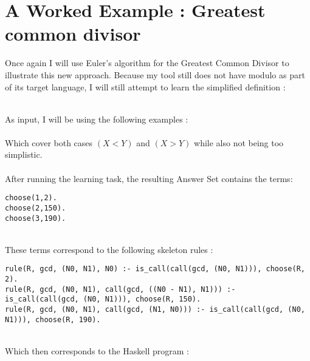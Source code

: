 \section{A Worked Example : Greatest common divisor}
Once again I will use Euler's algorithm for the Greatest Common Divisor to illustrate this new approach. Because my tool still does not have modulo as part of its target language, I will still attempt to learn the simplified definition :

 
\mbox{} \\
As input, I will be using the following examples : \\

 
\mbox{} \\
Which cover both cases $(X < Y)$ and $(X > Y)$ while also not being too simplistic. \\ \\
After running the learning task, the resulting Answer Set contains the terms: \\

\begin{lstlisting}
choose(1,2).
choose(2,150).
choose(3,190).
\end{lstlisting}
\mbox{} \\
These terms correspond to the following skeleton rules : \\

\begin{lstlisting}
rule(R, gcd, (N0, N1), N0) :- is_call(call(gcd, (N0, N1))), choose(R, 2). 
rule(R, gcd, (N0, N1), call(gcd, ((N0 - N1), N1))) :- is_call(call(gcd, (N0, N1))), choose(R, 150).
rule(R, gcd, (N0, N1), call(gcd, (N1, N0))) :- is_call(call(gcd, (N0, N1))), choose(R, 190).
\end{lstlisting}
\mbox{} \\
Which then corresponds to the Haskell program :

